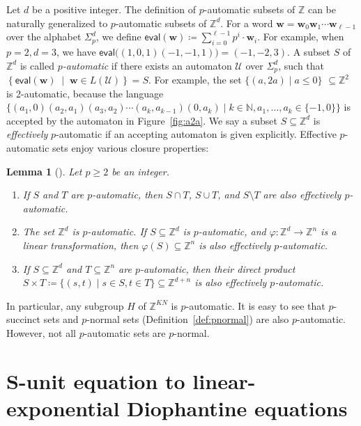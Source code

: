 \documentclass[letterpaper, 11pt, thm-restate]{article}
\numberwithin{equation}{section}
\newcommand{\Z}{\mathbb{Z}}
\newcommand{\N}{\mathbb{N}}
\newcommand{\bw}{\boldsymbol{w}}
\newcommand{\mmU}{\mathscr{U}}
\newcommand{\eval}{\mathsf{eval}}
\newtheorem{lem}[thrm]{Lemma}
\theoremstyle{definition}
\theoremstyle{definition}
\theoremstyle{definition}
\begin{document}
Let $d$ be a positive integer. The definition of $p$-automatic subsets of $\Z$ can be naturally generalized to $p$-automatic subsets of $\Z^d$.
For a word $\bw = \bw_0 \bw_1 \cdots \bw_{\ell-1}$ over the alphabet $\Sigma_p^d$, we define $\eval(\bw) \coloneqq \sum_{i = 0}^{\ell-1} p^i \cdot \bw_i$.
For example, when $p = 2, d = 3$, we have $\eval\big((1, 0, 1)(-1, -1, 1)\big) = (-1, -2, 3)$.
A subset $S$ of $\Z^d$ is called \emph{$p$-automatic} if there exists an automaton $\mmU$ over $\Sigma_p^d$, such that
$
\left\{\eval(\bw) \;\middle|\; \bw \in L(\mmU) \right\} = S
$.
For example, the set $\{(a, 2a) \mid a \leq 0\}$ $\subseteq \Z^2$ is 2-automatic, because the language
$
\{(a_1, 0)(a_2, a_1)(a_3, a_2) \cdots (a_k, a_{k-1}) (0, a_k) \mid k \in \N, a_1, \ldots, a_k \in \{-1, 0\}\}
$
is accepted by the automaton in Figure~\ref{fig:a2a}.
We say a subset $S \subseteq \Z^d$ is \emph{effectively} $p$-automatic if an accepting automaton is given explicitly.
Effective $p$-automatic sets enjoy various closure properties:

\begin{lem}[{\cite{wolper2000construction}}]\label{lem:pauto}
    Let $p \geq 2$ be an integer.
    \begin{enumerate}[nosep, label = (\arabic*)]
        \item If $S$ and $T$ are $p$-automatic, then $S \cap T$, $S \cup T$, and $S \setminus T$ are also effectively $p$-automatic.
        \item The set $\Z^d$ is $p$-automatic. If $S \subseteq \Z^d$ is $p$-automatic, and $\varphi \colon \Z^d \rightarrow \Z^n$ is a linear transformation, then $\varphi(S) \subseteq \Z^n$ is also effectively $p$-automatic.
        \item If $S \subseteq \Z^d$ and $T \subseteq \Z^n$ are $p$-automatic, then their direct product $S \times T \coloneqq \{(s, t) \mid s \in S, t \in T\} \subseteq \Z^{d+n}$ is also effectively $p$-automatic.
    \end{enumerate}
\end{lem}

In particular, any subgroup $H$ of $\Z^{KN}$ is $p$-automatic.
It is easy to see that $p$-succinct sets and $p$-normal sets (Definition~\ref{def:pnormal}) are also $p$-automatic.
However, not all $p$-automatic sets are $p$-normal.

\section{S-unit equation to linear-exponential Diophantine equations}\label{sec:stol}
\end{document}
